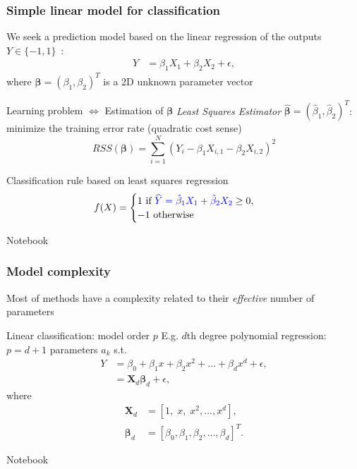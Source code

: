 \message{ !name(intro.tex)}\documentclass[pressentation,9pt,aspectratio=1610,xcolor=table]{beamer}
\newcommand{\structuretext}[1]{{\textcolor{blue}{#1}}}
\begin{document}
\begin{frame}
  \frametitle{Simple linear model for classification}
  We seek a prediction model based on the linear regression of the outputs 
  $Y \in \{-1,1\}$~:
  \begin{align*}
    Y & = \beta_1 X_1 + \beta_2 X_2 + \epsilon,
  \end{align*}
  where $\boldsymbol{\beta}=(\beta_1, \beta_2)^T $ is a 2D unknown parameter vector 
  
  \begin{block}{Learning problem $\Leftrightarrow$ Estimation of $\boldsymbol{\beta}$}
    {\it Least Squares Estimator} $\hat{\boldsymbol{\beta}}=(\hat{\beta}_1, \hat{\beta}_2)^T $: 
    minimize the training error rate (quadratic cost sense)
    $$
    RSS ( \boldsymbol{\beta} )= \sum_{i=1}^N (Y_i - \beta_1 X_{i,1} - \beta_2 X_{i,2} )^2
    $$
  \end{block}
  
  
  \begin{block}{Classification rule based on least squares regression}
    \vspace{-2mm}
    \begin{align*}
      f(X) &= \begin{cases}
        1 \textrm{ if } \structuretext{\widehat{Y}= \hat{\beta}_1 X_1 + \hat{\beta}_2 X_2} \ge 0,\\
        -1 \textrm{ otherwise}
      \end{cases}
    \end{align*}
  \end{block}

  \alert{Notebook}
\end{frame}
  
\begin{frame}
  \frametitle{Model complexity}
  Most of methods have a complexity related to their {\it effective} number of parameters

  \begin{block}{Linear classification: model order $p$}
  E.g. $d$th degree polynomial regression: $p=d+1$ parameters $a_k$ s.t.
    \begin{align*}
       Y &= \beta_0 + \beta_1 x + \beta_2 x^{2} + \ldots + \beta_d x^{d} + \epsilon,\\
       &= \boldsymbol{X}_d \boldsymbol{\beta}_d + \epsilon,
    \end{align*}
    where
    \begin{align*}
       \boldsymbol{X}_d &= \left[1, \;  x, \;  x^2, \ldots, x^d\right], \\
       \boldsymbol{\beta}_d &= \left[\beta_0, \beta_1, \beta_2, \ldots, \beta_d\right]^T.
    \end{align*}

  \end{block}
  \alert{Notebook}
\end{frame}
\end{document}
